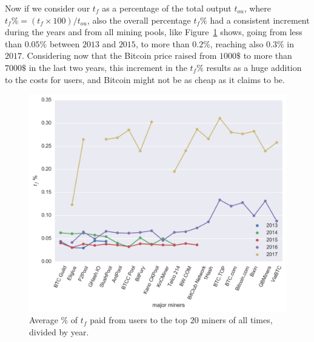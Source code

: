\documentclass[USenglish]{uit-thesis}
\begin{document}
Now if we consider our $t_f$ as a percentage of the
total output $t_{ou}$, where $t_f\% = (t_f \times 100)/t_{ou}$,
also the overall percentage $t_f\%$ had a consistent
increment during the years and from all mining pools,
like Figure~\ref{fig:fee_input_miners} shows, going from
less than $0.05\%$ between $2013$ and $2015$, to
more than $0.2\%$, reaching also $0.3\%$ in $2017$.
Considering now that the Bitcoin price raised from
$1000\$$ to more than $7000\$$ in the last two years,
this increment in the $t_f\%$ results as a huge addition
to the costs for users, and Bitcoin might not be as cheap
as it claims to be.
\begin{figure}[h]
	\centering
	\includegraphics[width=1\textwidth]{img/fee_input_miners}
	\caption{Average \% of $t_f$ paid from users to the top $20$ miners of all times, divided by year.}
	\label{fig:fee_input_miners}
\end{figure}

\end{document}
